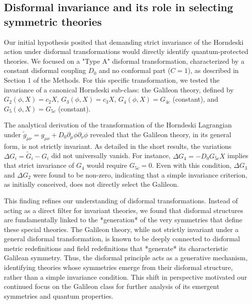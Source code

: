\documentclass[twocolumn]{aastex631}
\begin{document}
\subsection{Disformal invariance and its role in selecting symmetric theories}
Our initial hypothesis posited that demanding strict invariance of the Horndeski action under disformal transformations would directly identify quantum-protected theories. We focused on a "Type A" disformal transformation, characterized by a constant disformal coupling $D_0$ and no conformal part ($C=1$), as described in Section 1 of the Methods. For this specific transformation, we tested the invariance of a canonical Horndeski sub-class: the Galileon theory, defined by $G_2(\phi, X) = c_2 X$, $G_3(\phi, X) = c_3 X$, $G_4(\phi, X) = G_{4c}$ (constant), and $G_5(\phi, X) = G_{5c}$ (constant).

The analytical derivation of the transformation of the Horndeski Lagrangian under $\tilde{g}_{\mu\nu} = g_{\mu\nu} + D_0 \partial_\mu \phi \partial_\nu \phi$ revealed that the Galileon theory, in its general form, is not strictly invariant. As detailed in the short results, the variations $\Delta G_i = \tilde{G}_i - G_i$ did not universally vanish. For instance, $\Delta G_4 = -D_0 G_{5c} X$ implies that strict invariance of $G_4$ would require $G_{5c}=0$. Even with this condition, $\Delta G_3$ and $\Delta G_2$ were found to be non-zero, indicating that a simple invariance criterion, as initially conceived, does not directly select the Galileon.

This finding refines our understanding of disformal transformations. Instead of acting as a direct filter for invariant theories, we found that disformal structures are fundamentally linked to the *generation* of the very symmetries that define these special theories. The Galileon theory, while not strictly invariant under a general disformal transformation, is known to be deeply connected to disformal metric redefinitions and field redefinitions that *generate* its characteristic Galilean symmetry. Thus, the disformal principle acts as a generative mechanism, identifying theories whose symmetries emerge from their disformal structure, rather than a simple invariance condition. This shift in perspective motivated our continued focus on the Galileon class for further analysis of its emergent symmetries and quantum properties.
\end{document}
